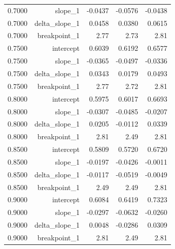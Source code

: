 \begin{longtable}{lrrrr}
  0.7000 & slope\_1 & -0.0437 & -0.0576 & -0.0438 \\
  0.7000 & delta\_slope\_1 & 0.0458 & 0.0380 & 0.0615 \\
  0.7000 & breakpoint\_1 & 2.77 & 2.73 & 2.81 \\
  0.7500 & intercept & 0.6039 & 0.6192 & 0.6577 \\
  0.7500 & slope\_1 & -0.0365 & -0.0497 & -0.0336 \\
  0.7500 & delta\_slope\_1 & 0.0343 & 0.0179 & 0.0493 \\
  0.7500 & breakpoint\_1 & 2.77 & 2.72 & 2.81 \\
  0.8000 & intercept & 0.5975 & 0.6017 & 0.6693 \\
  0.8000 & slope\_1 & -0.0307 & -0.0485 & -0.0207 \\
  0.8000 & delta\_slope\_1 & 0.0205 & -0.0112 & 0.0339 \\
  0.8000 & breakpoint\_1 & 2.81 & 2.49 & 2.81 \\
  0.8500 & intercept & 0.5809 & 0.5720 & 0.6720 \\
  0.8500 & slope\_1 & -0.0197 & -0.0426 & -0.0011 \\
  0.8500 & delta\_slope\_1 & -0.0117 & -0.0519 & -0.0049 \\
  0.8500 & breakpoint\_1 & 2.49 & 2.49 & 2.81 \\
  0.9000 & intercept & 0.6084 & 0.6419 & 0.7323 \\
  0.9000 & slope\_1 & -0.0297 & -0.0632 & -0.0260 \\
  0.9000 & delta\_slope\_1 & 0.0048 & -0.0286 & 0.0309 \\
  0.9000 & breakpoint\_1 & 2.81 & 2.49 & 2.81 \\
\end{longtable}
